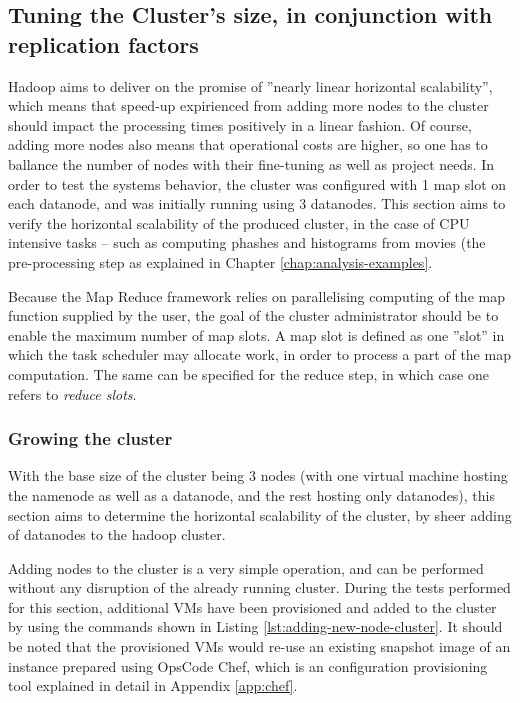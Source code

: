 \subsection{Tuning the Cluster's size, in conjunction with replication factors}
\label{sec:tuning-number-of-nodes}
Hadoop aims to deliver on the promise of ''nearly linear horizontal scalability'', which means that speed-up expirienced from adding more nodes to the cluster should impact the processing times positively in a linear fashion. Of course, adding more nodes also means that operational costs are higher, so one has to ballance the number of nodes with their fine-tuning as well as project needs. In order to test the systems behavior, the cluster was configured with 1 map slot on each datanode, and was initially running using 3 datanodes. This section aims to verify the horizontal scalability of the produced cluster, in the case of CPU intensive tasks -- such as computing phashes and histograms from movies (the pre-processing step as explained in Chapter \ref{chap:analysis-examples}.

Because the Map Reduce framework relies on parallelising computing of the map function supplied by the user, the goal of the cluster administrator should be to enable the maximum number of map slots. A map slot is defined as one ''slot'' in which the task scheduler may allocate work, in order to process a part of the map computation. The same can be specified for the reduce step, in which case one refers to \textit{reduce slots}.

\subsubsection{Growing the cluster}
\label{sec:growing-the-cluster}
With the base size of the cluster being 3 nodes (with one virtual machine hosting the namenode as well as a datanode, and the rest hosting only datanodes), this section aims to determine the horizontal scalability of the cluster, by sheer adding of datanodes to the hadoop cluster.

Adding nodes to the cluster is a very simple operation, and can be performed without any disruption of the already running cluster. During the tests performed for this section, additional VMs have been provisioned and added to the cluster by using the commands shown in Listing \ref{lst:adding-new-node-cluster}. It should be noted that the provisioned VMs would re-use an existing snapshot image of an instance prepared using OpsCode Chef, which is an configuration provisioning tool explained in detail in Appendix \ref{app:chef}. 

